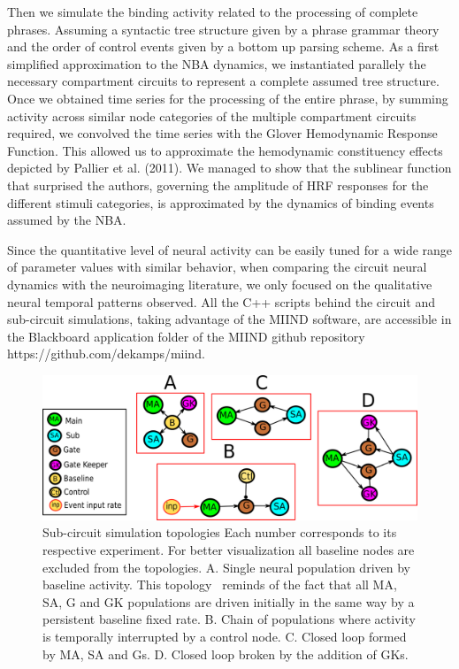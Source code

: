 \documentclass[10pt]{article}
\begin{document}
Then we simulate the binding activity related to the processing of
complete phrases. Assuming a syntactic tree structure given by a
phrase grammar theory and the order of control events given by a
bottom up parsing scheme. As a first simplified approximation to the
NBA dynamics, we instantiated parallely the necessary compartment
circuits to represent a complete assumed tree structure. Once we
obtained time series for the processing of the entire phrase, by
summing activity across similar node categories of the multiple
compartment circuits required, we convolved the time series with the
Glover Hemodynamic Response Function\cite{Glover_1999}. This allowed
us to approximate the hemodynamic constituency effects depicted by
Pallier et al. (2011)\cite{Pallier_2011}. We managed to show that the
sublinear function that surprised the authors, governing the amplitude
of HRF responses for the different stimuli categories, is approximated
by the dynamics of binding events assumed by the NBA.

Since the quantitative level of neural activity can be easily tuned
for a wide range of parameter values with similar behavior, when
comparing the circuit neural dynamics with the neuroimaging
literature, we only focused on the qualitative neural temporal
patterns observed. All the C++ scripts behind the circuit and
sub-circuit simulations, taking advantage of the MIIND
software\cite{de_Kamps_2008}\cite{harrison2011new}, are accessible in
the Blackboard application folder of the MIIND github repository
https://github.com/dekamps/miind.

\begin{figure}[h!]
  \begin{center}
    \includegraphics[width=0.70\columnwidth]{figures/sub_circuits3/sub_circuits3}
    \caption{{Sub-circuit simulation topologies {\label{637398}} Each
        number corresponds to its respective experiment. For better
        visualization all baseline nodes are excluded from the
        topologies. A. Single neural population driven by baseline
        activity. This topology~ reminds of the fact that all MA, SA,
        G and GK populations are driven initially in the same way by a
        persistent baseline fixed rate. B. Chain of populations where
        activity is temporally interrupted by a control node. C.
        Closed loop formed by MA, SA and Gs. D. Closed loop broken by
        the addition of GKs. {\label{637398}}%
      }}
  \end{center}
\end{figure}
\end{document}
